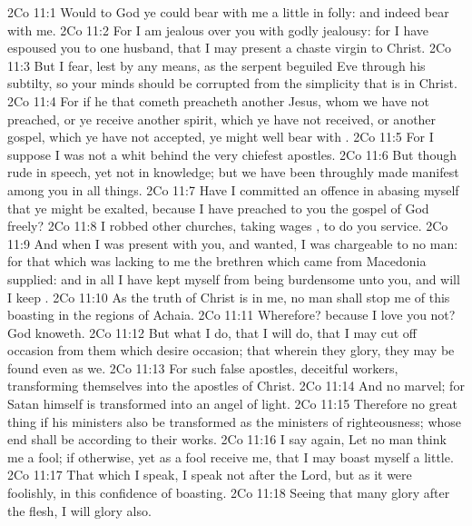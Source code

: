 \vs 2Co 11:1 Would to God ye could bear with me a little in  folly: and indeed bear with me.
\vs 2Co 11:2 For I am jealous over you with godly jealousy: for I have espoused you to one husband, that I may present  a chaste virgin to Christ.
\vs 2Co 11:3 But I fear, lest by any means, as the serpent beguiled Eve through his subtilty, so your minds should be corrupted from the simplicity that is in Christ.
\vs 2Co 11:4 For if he that cometh preacheth another Jesus, whom we have not preached, or  ye receive another spirit, which ye have not received, or another gospel, which ye have not accepted, ye might well bear with .
\vs 2Co 11:5 For I suppose I was not a whit behind the very chiefest apostles.
\vs 2Co 11:6 But though  rude in speech, yet not in knowledge; but we have been throughly made manifest among you in all things.
\vs 2Co 11:7 Have I committed an offence in abasing myself that ye might be exalted, because I have preached to you the gospel of God freely?
\vs 2Co 11:8 I robbed other churches, taking wages , to do you service.
\vs 2Co 11:9 And when I was present with you, and wanted, I was chargeable to no man: for that which was lacking to me the brethren which came from Macedonia supplied: and in all  I have kept myself from being burdensome unto you, and  will I keep .
\vs 2Co 11:10 As the truth of Christ is in me, no man shall stop me of this boasting in the regions of Achaia.
\vs 2Co 11:11 Wherefore? because I love you not? God knoweth.
\vs 2Co 11:12 But what I do, that I will do, that I may cut off occasion from them which desire occasion; that wherein they glory, they may be found even as we.
\vs 2Co 11:13 For such  false apostles, deceitful workers, transforming themselves into the apostles of Christ.
\vs 2Co 11:14 And no marvel; for Satan himself is transformed into an angel of light.
\vs 2Co 11:15 Therefore  no great thing if his ministers also be transformed as the ministers of righteousness; whose end shall be according to their works.
\vs 2Co 11:16 I say again, Let no man think me a fool; if otherwise, yet as a fool receive me, that I may boast myself a little.
\vs 2Co 11:17 That which I speak, I speak  not after the Lord, but as it were foolishly, in this confidence of boasting.
\vs 2Co 11:18 Seeing that many glory after the flesh, I will glory also.
